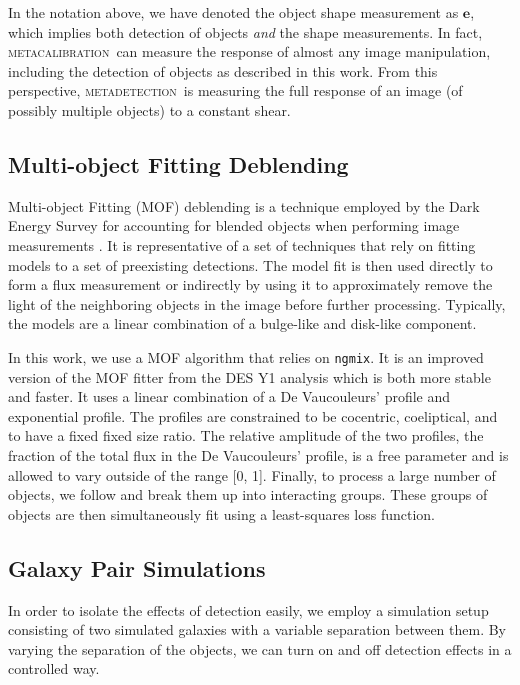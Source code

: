 \documentclass[fleqn,useAMS,usenatbib]{mnras}
\newcommand{\ngmix}{\texttt{ngmix}}
\newcommand{\mcal}{\textsc{metacalibration}}
\newcommand{\mdet}{\textsc{metadetection}}
\begin{document}
In the notation above, we have denoted the object shape measurement as $\boldsymbol{e}$,
which implies both detection of objects {\it and} the shape measurements. In fact,
\mcal\ can measure the response of almost any image manipulation, including the
detection of objects as described in this work. From this perspective, \mdet\
is measuring the full response of an image (of possibly multiple objects) to
a constant shear.

\subsection{Multi-object Fitting Deblending}

Multi-object Fitting (MOF) deblending is a technique employed by the Dark
Energy Survey for accounting for blended objects when performing image
measurements \citep{DESY1cat}. It is representative of a set of techniques that
rely on fitting models to a set of preexisting detections. The model fit is
then used directly to form a flux measurement or indirectly by using it to
approximately remove the light of the neighboring objects in the image
before further processing. Typically, the models are a linear combination
of a bulge-like and disk-like component.

In this work, we use a MOF algorithm
that relies on \ngmix. It is an improved version of the MOF fitter from the
DES Y1 analysis which is both more stable and faster. It uses a linear combination
of a De Vaucouleurs' \citep{devauc1948} profile and exponential profile. The
profiles are constrained to be cocentric, coeliptical, and to have a fixed
fixed size ratio. The relative amplitude of the two profiles, the fraction of the
total flux in the De Vaucouleurs' profile, is a free parameter and is allowed
to vary outside of the range [0, 1]. Finally, to process a large number of
objects, we follow \citet{DESY1cat} and break them up into interacting groups.
These groups of objects are then simultaneously fit using a least-squares loss
function.

\subsection{Galaxy Pair Simulations}
\label{sec:sims:pairs}

In order to isolate the effects of detection easily, we employ a simulation setup
consisting of two simulated galaxies with a variable separation between them. By
varying the separation of the objects, we can turn on and off detection effects
in a controlled way.
\end{document}
